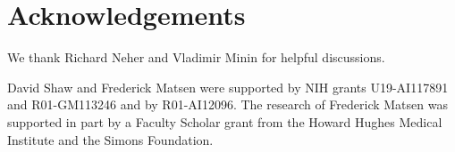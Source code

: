 \documentclass{article}
\newcommand{\beginsupplement}{%
        \setcounter{table}{0}
        \renewcommand{\thetable}{S\arabic{table}}%
        \setcounter{figure}{0}
        \renewcommand{\thefigure}{S\arabic{figure}}%
     }
\begin{document}
\section*{Acknowledgements}
We thank Richard Neher and Vladimir Minin for helpful discussions.

David Shaw and Frederick Matsen were supported by NIH grants U19-AI117891 and R01-GM113246 and by R01-AI12096.
The research of Frederick Matsen was supported in part by a Faculty Scholar grant from the Howard Hughes Medical Institute and the Simons Foundation.




\newpage
\beginsupplement


\end{document}
